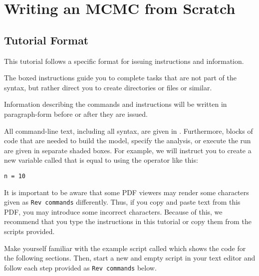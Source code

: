 \section{Writing an MCMC from Scratch}

\medskip
\subsection{Tutorial Format}\label{subsect:Exercise-Format}

This tutorial follows a specific format for issuing instructions and information.

{\begin{framed}
The boxed instructions guide you to complete tasks that are not part of the \RevBayes syntax, but rather direct you to create directories or files or similar.
\end{framed}}

Information describing the commands and instructions will be written in paragraph-form before or after they are issued.

All command-line text, including all \Rev syntax, are given in . 
Furthermore, blocks of \Rev code that are needed to build the model, specify the analysis, or execute the run are given in separate shaded boxes.
For example, we will instruct you to create a new variable called  that is equal to  using the \cl{=} operator like this:
{\tt \begin{snugshade*}
\begin{lstlisting}
n = 10
\end{lstlisting}
\end{snugshade*}}

It is important to be aware that some PDF viewers may render some characters given as \colorbox{shadecolor}{\tt{Rev commands}} differently. 
Thus, if you copy and paste text from this PDF, you may introduce some incorrect characters. 
Because of this, we recommend that you type the instructions in this tutorial or copy them from the scripts provided. 



{\begin{framed}
Make yourself familiar with the example script called  which shows the code for the following sections. Then, start a new and empty script in your text editor and follow each step provided  as \colorbox{shadecolor}{\tt{Rev commands}} below.
\end{framed}}

